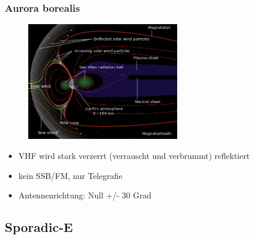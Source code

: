 \begin{frame}
  \frametitle{Aurora borealis}

  \begin{center}
    \begin{figure}
      \includegraphics[width=0.6\textwidth,height=.5\textheight,keepaspectratio]{bv11/Structure_of_the_magnetosphere-en.png}
    \end{figure}
  \end{center}

  \begin{itemize}
    \item VHF wird stark verzerrt (verrauscht und verbrummt) reflektiert
    \item kein SSB/FM, nur Telegrafie
    \item Antennenrichtung: Null +/- 30 Grad
  \end{itemize}

\end{frame}

\subsection{Sporadic-E}

